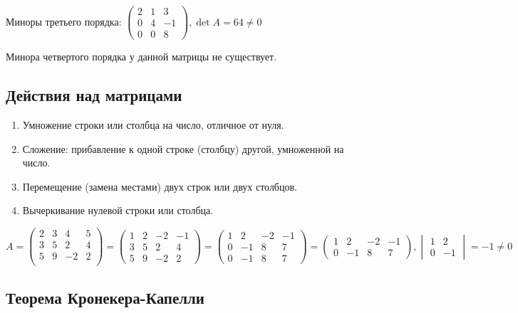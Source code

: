 \documentclass{article}
\begin{document}
Миноры третьего порядка: $\begin{pmatrix} 2 & 1 & 3 \\ 0 & 4 & -1 \\ 0 & 0 & 8\end{pmatrix}, \det A = 64 \ne 0$

Минора четвертого порядка у данной матрицы не существует.

\subsection{Действия над матрицами}

\begin{enumerate}
    \item Умножение строки или столбца на число, отличное от нуля.
    \item Сложение: прибавление к одной строке (столбцу) другой, умноженной на число.
    \item Перемещение (замена местами) двух строк или двух столбцов.
    \item Вычеркивание нулевой строки или столбца.
\end{enumerate}

$
A = \begin{pmatrix}
 2 & 3 & 4 & 5 \\
 3 & 5 & 2 & 4 \\
 5 & 9 & -2 & 2 \\
\end{pmatrix} = \begin{pmatrix}
    1 & 2 & -2 & -1 \\
    3 & 5 & 2 & 4 \\
    5 & 9 & -2 & 2
\end{pmatrix} = \begin{pmatrix}
    1 & 2 & -2 & -1 \\
    0 & -1 & 8 & 7 \\
    0 & -1 & 8 & 7
\end{pmatrix} = \begin{pmatrix}
 1 & 2 & -2 & -1 \\
 0 & -1 & 8 & 7
\end{pmatrix}, \begin{vmatrix} 1 & 2 \\ 0 & -1 \end{vmatrix} = -1 \ne 0
$

\subsection{Теорема Кронекера-Капелли}
\end{document}
